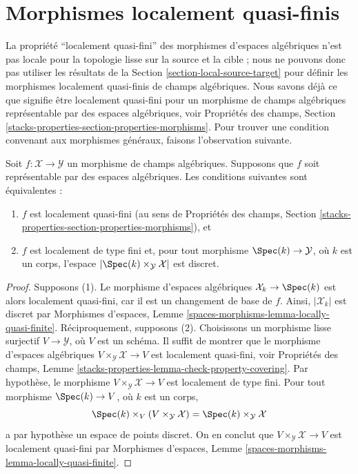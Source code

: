 \section{Morphismes localement quasi-finis}
\label{section-locally-quasi-finite}

\noindent
La propriété ``localement quasi-fini'' des morphismes d'espaces algébriques
n'est pas locale pour la topologie lisse sur la source et la cible ; nous ne
pouvons donc pas utiliser les résultats de la
Section \ref{section-local-source-target} pour définir les morphismes
localement quasi-finis de champs algébriques. Nous savons déjà ce que signifie
être localement quasi-fini pour un morphisme de champs algébriques
représentable par des espaces algébriques, voir Propriétés des champs, Section
\ref{stacks-properties-section-properties-morphisms}.
Pour trouver une condition convenant aux morphismes généraux, faisons
l'observation suivante.

\begin{lemma}
\label{lemma-representable-by-spaces-quasi-finite}
Soit $f : \mathcal{X} \to \mathcal{Y}$ un morphisme de champs algébriques.
Supposons que $f$ soit représentable par des espaces algébriques.
Les conditions suivantes sont équivalentes :
\begin{enumerate}
\item $f$ est localement quasi-fini (au sens de Propriétés des champs,
Section \ref{stacks-properties-section-properties-morphisms}), et
\item $f$ est localement de type fini et, pour tout morphisme
$\Spec(k) \to \mathcal{Y}$, où $k$ est un corps, l'espace
$|\Spec(k) \times_\mathcal{Y} \mathcal{X}|$ est discret.
\end{enumerate}
\end{lemma}

\begin{proof}
Supposons (1). Le morphisme d'espaces algébriques
$\mathcal{X}_k \to \Spec(k)$ est alors localement quasi-fini, car il est un
changement de base de $f$. Ainsi, $|\mathcal{X}_k|$ est discret par
Morphismes d'espaces, Lemme
\ref{spaces-morphisms-lemma-locally-quasi-finite}.
Réciproquement, supposons (2). Choisissons un morphisme lisse surjectif
$V \to \mathcal{Y}$, où $V$ est un schéma. Il suffit de montrer que le
morphisme d'espaces algébriques $V \times_\mathcal{Y} \mathcal{X} \to V$
est localement quasi-fini, voir Propriétés des champs, Lemme
\ref{stacks-properties-lemma-check-property-covering}.
Par hypothèse, le morphisme $V \times_\mathcal{Y} \mathcal{X} \to V$ est
localement de type fini. Pour tout morphisme $\Spec(k) \to V$, où $k$ est
un corps,
$$
\Spec(k) \times_V (V \times_\mathcal{Y} \mathcal{X}) =
\Spec(k) \times_\mathcal{Y} \mathcal{X}
$$
a par hypothèse un espace de points discret. On en conclut que
$V \times_\mathcal{Y} \mathcal{X} \to V$ est localement quasi-fini par
Morphismes d'espaces, Lemme
\ref{spaces-morphisms-lemma-locally-quasi-finite}.
\end{proof}

